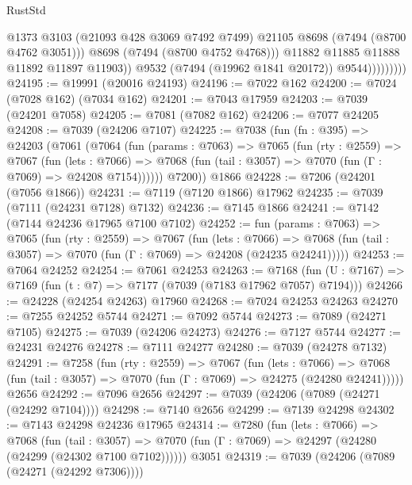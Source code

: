 \begin{lexlean}{RustStd}
\begin{coremodule}
                              @1373
                              @3103
                              (@21093 @428 @3069 @7492 @7499)
                              @21105
                              @8698
                              (@7494 (@8700 @4762 @3051)))
                            @8698
                            (@7494 (@8700 @4752 @4768)))
                          @11882
                          @11885
                          @11888
                          @11892
                          @11897
                          @11903))
                      @9532
                      (@7494 (@19962 @1841 @20172))
                      @9544)))))))))
@24195 := @19991 (@20016 @24193)
@24196 := @7022 @162
@24200 := @7024 (@7028 @162) (@7034 @162)
@24201 := @7043 @17959
@24203 := @7039 (@24201 @7058)
@24205 := @7081 (@7082 @162)
@24206 := @7077 @24205
@24208 := @7039 (@24206 @7107)
@24225 := @7038
    (fun (fn : @395) =>
    @24203
      (@7061
        (@7064
          (fun (params : @7063) =>
          @7065
            (fun (rty : @2559) =>
            @7067
              (fun (lets : @7066) =>
              @7068 (fun (tail : @3057) => @7070 (fun (Γ : @7069) => @24208 @7154))))))
        @7200))
    @1866
@24228 := @7206 (@24201 (@7056 @1866))
@24231 := @7119 (@7120 @1866) @17962
@24235 := @7039 (@7111 (@24231 @7128) @7132)
@24236 := @7145 @1866
@24241 := @7142 (@7144 @24236 @17965 @7100 @7102)
@24252 := fun (params : @7063) =>
  @7065
    (fun (rty : @2559) =>
    @7067
      (fun (lets : @7066) =>
      @7068 (fun (tail : @3057) => @7070 (fun (Γ : @7069) => @24208 (@24235 @24241)))))
@24253 := @7064 @24252
@24254 := @7061 @24253
@24263 := @7168
    (fun (U : @7167) => @7169 (fun (t : @7) => @7177 (@7039 (@7183 @17962 @7057) @7194)))
@24266 := @24228 (@24254 @24263) @17960
@24268 := @7024 @24253 @24263
@24270 := @7255 @24252 @5744
@24271 := @7092 @5744
@24273 := @7089 (@24271 @7105)
@24275 := @7039 (@24206 @24273)
@24276 := @7127 @5744
@24277 := @24231 @24276
@24278 := @7111 @24277
@24280 := @7039 (@24278 @7132)
@24291 := @7258
    (fun (rty : @2559) =>
    @7067
      (fun (lets : @7066) =>
      @7068 (fun (tail : @3057) => @7070 (fun (Γ : @7069) => @24275 (@24280 @24241)))))
    @2656
@24292 := @7096 @2656
@24297 := @7039 (@24206 (@7089 (@24271 (@24292 @7104))))
@24298 := @7140 @2656
@24299 := @7139 @24298
@24302 := @7143 @24298 @24236 @17965
@24314 := @7280
    (fun (lets : @7066) =>
    @7068
      (fun (tail : @3057) =>
      @7070 (fun (Γ : @7069) => @24297 (@24280 (@24299 (@24302 @7100 @7102))))))
    @3051
@24319 := @7039 (@24206 (@7089 (@24271 (@24292 @7306))))

\end{coremodule}
\end{lexlean}
